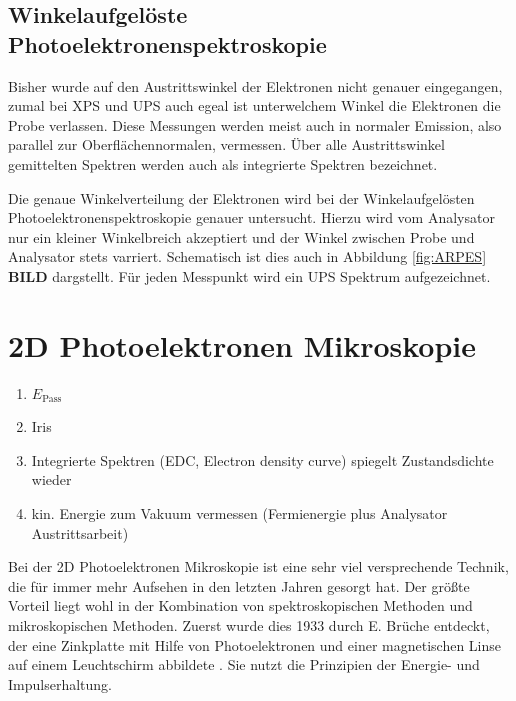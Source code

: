         \subsection{Winkelaufgelöste Photoelektronenspektroskopie}
            Bisher wurde  auf den Austrittswinkel der Elektronen nicht genauer eingegangen, zumal bei XPS und UPS auch egeal ist unterwelchem Winkel die Elektronen die Probe verlassen.
            Diese Messungen werden meist auch in normaler Emission, also parallel zur Oberflächennormalen, vermessen.
            Über alle Austrittswinkel gemittelten Spektren werden auch als integrierte Spektren bezeichnet.

            Die genaue Winkelverteilung der Elektronen wird bei der Winkelaufgelösten Photoelektronenspektroskopie genauer untersucht.
            Hierzu wird vom Analysator nur ein kleiner Winkelbreich akzeptiert und der Winkel zwischen Probe und Analysator stets varriert.
            Schematisch ist dies auch in Abbildung \ref{fig:ARPES} \textbf{BILD} dargstellt.
            Für jeden Messpunkt wird ein UPS Spektrum aufgezeichnet.


    \section{2D Photoelektronen Mikroskopie} \label{sec:2D-PES}
        \begin{enumerate}
            \item $E_\text{Pass}$
            \item Iris
            \item Integrierte Spektren (EDC, Electron density curve) spiegelt Zustandsdichte wieder
            \item kin. Energie zum Vakuum vermessen (Fermienergie plus Analysator Austrittsarbeit)
        \end{enumerate}
        Bei der 2D Photoelektronen Mikroskopie ist eine sehr viel versprechende Technik, die für immer mehr Aufsehen in den letzten Jahren gesorgt hat.
        Der größte Vorteil liegt wohl in der Kombination von spektroskopischen Methoden und mikroskopischen Methoden.
        Zuerst wurde dies 1933 durch E. Brüche entdeckt, der eine Zinkplatte mit Hilfe von Photoelektronen und einer magnetischen Linse auf einem Leuchtschirm abbildete \cite{bruche_elektronenmikroskopische_1933}.
        Sie nutzt die Prinzipien der Energie- und Impulserhaltung.


